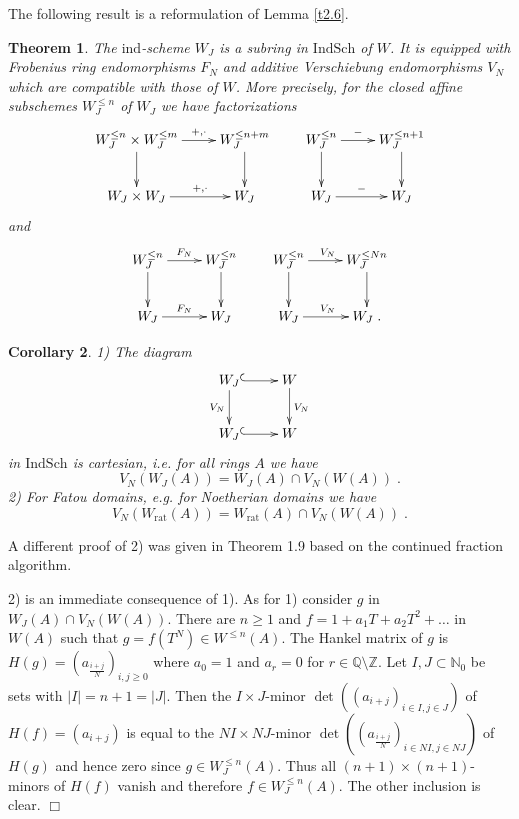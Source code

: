 \documentclass[12pt,leqno]{article}
\newcommand{\N}{\mathbb{N}}
\newcommand{\Q}{{\mathbb{Q}}}
\newcommand{\Z}{{\mathbb{Z}}}
\newcommand{\ind}{\mathrm{ind}}
\newcommand{\rat}{\mathrm{rat}}
\newcommand{\Indsch}{\mathrm{IndSch}}
\newtheorem{theorem}{Theorem}[section]
\newtheorem{cor}[theorem]{Corollary}
\newenvironment{rem}{\noindent {\bf Remark}}{}
\newenvironment{proof}{\noindent {\bf Proof}}{\mbox{}\hspace*{\fill}$\Box$}
\begin{document}
The following result is a reformulation of Lemma \ref{t2.6}. 

\begin{theorem}
\label{t2.8}
The $\ind$-scheme $W_J$ is a subring in $\Indsch$ of $W$. It is equipped with Frobenius ring endomorphisms $F_N$ and additive Verschiebung endomorphisms $V_N$ which are compatible with those of $W$. More precisely, for the closed affine subschemes $W^{\le n}_J$ of $W_J$ we have factorizations
\[
\xymatrix{
W^{\le n}_J \times W^{\le m}_J \ar[d] \ar[r]^-{+ , \cdot} & W^{\le n+m}_J \ar[d] \\
W_J \times W_J \ar[r]^-{+ , \cdot} & W_J 
}
\qquad
\xymatrix{
W^{\le n}_J \ar[d] \ar[r]^-{-} & W^{\le n+1}_J \ar[d] \\
W_J \ar[r]^{-} & W_J
}
\]
and
\[
\xymatrix{
W^{\le n}_J \ar[d] \ar[r]^{F_N} & W^{\le n}_J \ar[d] \\
W_J \ar[r]^{F_N} & W_J
}
\qquad
\xymatrix{
W^{\le n}_J \ar[d] \ar[r]^{V_N} & W^{\le Nn}_J \ar[d] \\
W_J \ar[r]^{V_N} & W_J \; .
}
\]
\end{theorem}

\begin{cor}
\label{t2.9}
1) The diagram
\[
\xymatrix{
W_J \ar@{^{(}->}[r] \ar[d]_{V_N} & W \ar[d]^{V_N}\\
W_J \ar@{^{(}->}[r] & W
}
\]
in $\Indsch$ is cartesian, i.e. for all rings $A$ we have
\[
V_N (W_J (A)) = W_J (A) \cap V_N (W (A)) \; .
\]
2) For Fatou domains, e.g. for Noetherian domains we have
\[
V_N (W_{\rat} (A)) = W_{\rat} (A) \cap V_N (W (A)) \; .
\]
\end{cor}

\begin{rem}
A different proof of 2) was given in \cite{D} Theorem 1.9 based on the continued fraction algorithm.
\end{rem}

\begin{proof}
2) is an immediate consequence of 1). As for 1) consider $g$ in $W_J (A) \cap V_N (W (A))$. There are $n \ge 1$ and $f = 1 + a_1 T + a_2 T^2 + \ldots$ in $W (A)$ such that $g = f (T^N) \in W^{\le n} (A)$. The Hankel matrix of $g$ is $H (g) = ( a_{\frac{i+j}{N}})_{i,j \ge 0}$ where $a_0 = 1$ and $a_r = 0$ for $r \in \Q \setminus \Z$. Let $I, J \subset \N_0$ be sets with $|I| = n+1 = |J|$. Then the $I \times J$-minor $\det ((a_{i+j})_{i \in I , j \in J})$ of $H (f) = (a_{i+j})$ is equal to the $NI \times NJ$-minor $\det ((a_{\frac{i+j}{N}})_{i \in NI , j \in NJ})$ of $H (g)$ and hence zero since $g \in W^{\le n}_J (A)$. Thus all $(n +1 ) \times (n+1)$-minors of $H (f)$ vanish and therefore $f \in W^{\le n}_J (A)$. The other inclusion is clear.
\end{proof}
\end{document}
